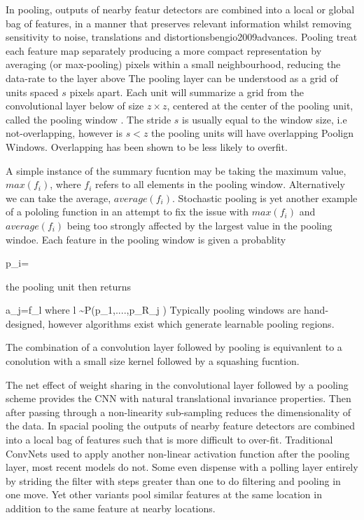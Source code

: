 In pooling, outputs of nearby featur detectors are combined into a local or global bag of features, in a manner that preserves relevant information whilst removing sensitivity to  noise, translations and distortions\citep{lecun1995convolutional}{bengio2009advances}.
Pooling treat each feature map separately producing a more compact representation by averaging (or max-pooling) pixels within a small neighbourhood, reducing the data-rate to the layer above\citep{dengthree}\citep{lecun2010convolutional}
\citep{bengio2009advances}
The pooling layer can be understood as a grid of units spaced $s$ pixels apart.
Each unit will summarize a grid from the convolutional layer below of size $z\times z$, centered at the center of the pooling unit, called the pooling window\citep{chen2014big} .
The stride $s$ is usually equal to the window size, i.e not-overlapping, however is $s<z$ the pooling units will have overlapping Poolign Windows.
Overlapping has been shown to be less likely to overfit\citep{bengio2009advances}\citep{krizhevsky2012imagenet}.
\citep{bengio2009advances}

A simple instance of the summary fucntion may be taking the maximum value,$max(f_i)$, where $f_i$ refers to all elements in the pooling window\citep{bengio2009advances}\citep{lecun2010convolutional}.
Alternatively we can take the average, $average(f_i)$.
Stochastic pooling\citep{bengio2009advances} is yet another example of a pololing function in an attempt to fix the issue with $max(f_i)$ and $average(f_i)$ being too strongly affected by the largest value in the pooling windoe.
Each feature in the pooling window is given a probablity

\be
p_i=
\ee

the pooling unit then returns

\be
a_j=f_l where l \sim P(p_1,....,p_{\vert R_j \vert})
\ee
Typically pooling windows are hand-designed, however algorithms exist which generate learnable pooling regions\citep{bengio2009advances}.

The combination of a convolution layer followed by pooling is equivanlent to a conolution with a small size kernel followed by  a squashing fucntion.

The net effect of weight sharing in the convolutional layer followed by a pooling scheme provides the CNN with natural translational invariance properties\citep{dengthree}.
Then after passing through a non-linearity sub-sampling reduces the dimensionality of the data.
In spacial pooling the outputs of nearby feature detectors are combined into a local bag of features such that is more difficult to over-fit\citep{goyal2014object}.
Traditional ConvNets used to apply another non-linear activation function after the pooling layer, most recent models do not.
Some even dispense with a polling layer entirely by striding the filter with steps greater than one to do filtering and pooling in one move.
Yet other variants pool similar features at the same location in addition to the same feature at nearby locations\citep{goyal2014object}.

